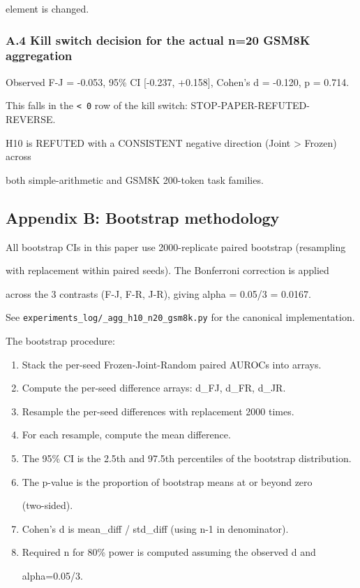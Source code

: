 \documentclass[11pt]{article}
\begin{document}
element is changed.

\subsubsection{A.4 Kill switch decision for the actual n=20 GSM8K
aggregation}\label{a.4-kill-switch-decision-for-the-actual-n20-gsm8k-aggregation}

Observed F-J = -0.053, 95\% CI {[}-0.237, +0.158{]}, Cohen's d = -0.120,
p = 0.714.

This falls in the \texttt{\textless{}\ 0} row of the kill switch:
STOP-PAPER-REFUTED-REVERSE.

H10 is REFUTED with a CONSISTENT negative direction (Joint
\textgreater{} Frozen) across

both simple-arithmetic and GSM8K 200-token task families.

\subsection{Appendix B: Bootstrap
methodology}\label{appendix-b-bootstrap-methodology}

All bootstrap CIs in this paper use 2000-replicate paired bootstrap
(resampling

with replacement within paired seeds). The Bonferroni correction is
applied

across the 3 contrasts (F-J, F-R, J-R), giving alpha = 0.05/3 = 0.0167.

See \texttt{experiments\_log/\_agg\_h10\_n20\_gsm8k.py} for the
canonical implementation.

The bootstrap procedure:

\begin{enumerate}
\def\labelenumi{\arabic{enumi}.}
\item
  Stack the per-seed Frozen-Joint-Random paired AUROCs into arrays.
\item
  Compute the per-seed difference arrays: d\_FJ, d\_FR, d\_JR.
\item
  Resample the per-seed differences with replacement 2000 times.
\item
  For each resample, compute the mean difference.
\item
  The 95\% CI is the 2.5th and 97.5th percentiles of the bootstrap
  distribution.
\item
  The p-value is the proportion of bootstrap means at or beyond zero

  (two-sided).
\item
  Cohen's d is mean\_diff / std\_diff (using n-1 in denominator).
\item
  Required n for 80\% power is computed assuming the observed d and

  alpha=0.05/3.
\end{enumerate}
\end{document}
